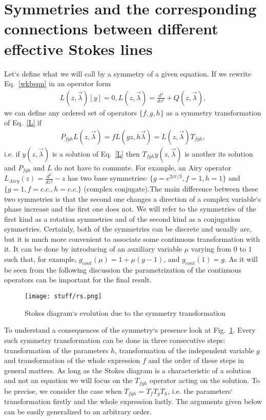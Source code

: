\documentclass[aps,prl,preprint,superscriptaddress]{revtex4}
\begin{document}
\section{Symmetries and the corresponding connections between different effective Stokes lines \label{SMMTRS}}
Let`s define what we will call by a symmetry of a given equation. If we rewrite Eq.~\ref{wkbeqn} in an operator form
\begin{eqnarray}
L(z,\vec{\lambda})[y]=0, L(z,\vec{\lambda})=\frac{d^2}{dz^2} + Q(z,\vec{\lambda}),   \label{L}
\end{eqnarray}
we can define any ordered set of operators $\{f,g,h\}$ as a symmetry transformation of Eq.~\ref{L} if
\begin{eqnarray}
P_{fgh}L(z,\vec{\lambda})=fL(gz,h\vec{\lambda})=L(z,\vec{\lambda})T_{fgh},   
\label{symmdef}
\end{eqnarray}
i.e. if $y(z,\vec{\lambda})$ is a solution of Eq.~\ref{L} then $T_{fgh}y(z,\vec{\lambda})$ is another its solution and $P_{fgh}$ and $L$ do not have to commute. 
For example, an Airy operator $L_{Airy}(z) = \frac{d^2}{dz^2} - z$ has two base symmetries: $\{g=e^{2i\pi/3},f=1,h=1\}$ 
and $\{g=1,f=c.c.,h=c.c.\}$ (complex conjugate).The main difference between these two symmetries is that the second one changes a direction of a complex variable`s phase increase and the first one does not. We will refer to the symmetries of the first kind as a rotation symmetries and of the second kind as a conjugation symmetries. Certainly, both of the symmetries can be discrete and usually are, but it is much more convenient to associate some continuous transformation with it. It can be done by introducing of an auxiliary variable $\mu$ varying from $0$ to $1$ such that, for example, $g_{cont}(\mu)=1+\mu (g-1)$, and $g_{cont}(1)=g$. As it will be seen from the following discussion the parametrization of the continuous operators can be important for the final result.

\begin{figure}
\centering
\noindent
\texttt{[image: stuff/rs.png]}
\caption{Stokes diagram`s evolution due to the symmetry transformation}
\label{rs}
\end{figure} 

To understand a consequences of the symmetry`s presence look at Fig.~\ref{rs}. Every such symmetry transformation can be done in three consecutive steps: transformation of the parameters $h$, transformation of the independent variable $g$ and transformation of the whole expression $f$ and the order of these steps in general matters. As long as the Stokes diagram is a characteristic of a solution and not an equation we will focus on the $T_{fgh}$ operator acting on the solution. To be precise, we consider the case when $T_{fgh}=T_f T_g T_h$, i.e. the parameters` transformation firstly and the whole expression lastly. The arguments given below can be easily generalized to an arbitrary order.
\end{document}
